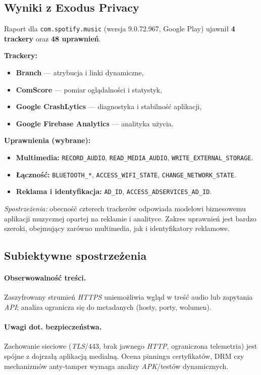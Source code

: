 \subsection{Wyniki z Exodus Privacy \cite{ExodusPrivacy}}
Raport dla \texttt{com.spotify.music} (wersja 9.0.72.967, Google Play) ujawnił \textbf{4 trackery} oraz \textbf{48 uprawnień}.

\textbf{Trackery:}
\begin{itemize}
  \item \textbf{Branch} — atrybucja i linki dynamiczne,
  \item \textbf{ComScore} — pomiar oglądalności i statystyk,
  \item \textbf{Google CrashLytics} — diagnostyka i stabilność aplikacji,
  \item \textbf{Google Firebase Analytics} — analityka użycia.
\end{itemize}

\textbf{Uprawnienia (wybrane):}
\begin{itemize}
  \item \textbf{Multimedia:} \texttt{RECORD\_AUDIO}, \texttt{READ\_MEDIA\_AUDIO}, \texttt{WRITE\_EXTERNAL\_STORAGE}.
  \item \textbf{Łączność:} \texttt{BLUETOOTH\_*}, \texttt{ACCESS\_WIFI\_STATE}, \texttt{CHANGE\_NETWORK\_STATE}.
  \item \textbf{Reklama i identyfikacja:} \texttt{AD\_ID}, \texttt{ACCESS\_ADSERVICES\_AD\_ID}.
\end{itemize}

\emph{Spostrzeżenia:} obecność czterech trackerów odpowiada modelowi biznesowemu aplikacji muzycznej opartej na reklamie i analityce. Zakres uprawnień jest bardzo szeroki, obejmujący zarówno multimedia, jak i identyfikatory reklamowe.

\subsection{Subiektywne spostrzeżenia}
\paragraph{Obserwowalność treści.}
Zaszyfrowany strumień \emph{HTTPS} uniemożliwia wgląd w treść audio lub zapytania \emph{API}; analiza ogranicza się do metadanych (hosty, porty, wolumen).

\paragraph{Uwagi dot. bezpieczeństwa.}
Zachowanie sieciowe (\emph{TLS}/443, brak jawnego \emph{HTTP}, ograniczona telemetria) jest spójne z dojrzałą aplikacją medialną. Ocena pinningu certyfikatów, DRM czy mechanizmów anty-tamper wymaga analizy \emph{APK}/testów dynamicznych.


